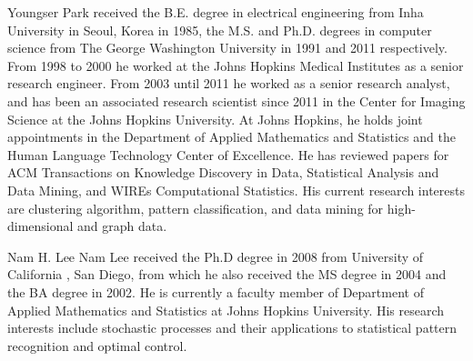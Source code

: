 \documentclass[10pt,draftclsnofoot,onecolumn]{IEEEtran}
\theoremstyle{definition}
\begin{document}
  \begin{IEEEbiography}{Youngser Park}
    received the B.E. degree in electrical engineering from Inha
    University in Seoul, Korea in 1985, the M.S. and Ph.D. degrees in
    computer science from The George Washington University in 1991 and
    2011 respectively. From 1998 to 2000 he worked at the Johns
    Hopkins Medical Institutes as a senior research engineer. From
    2003 until 2011 he worked as a senior research analyst, and has
    been an associated research scientist since 2011 in the Center for
    Imaging Science at the Johns Hopkins University. At Johns Hopkins,
    he holds joint appointments in the Department of Applied
    Mathematics and Statistics and the Human Language Technology
    Center of Excellence. He has reviewed papers for ACM Transactions
    on Knowledge Discovery in Data, Statistical Analysis and Data
    Mining, and WIREs Computational Statistics. His current research
    interests are clustering algorithm, pattern classification, and
    data mining for high-dimensional and graph data.
\end{IEEEbiography}

  \begin{IEEEbiography}{Nam H. Lee}
    Nam Lee received the Ph.D degree in 2008 from University of California ,
San Diego, from which he also received the MS degree in 2004 and the
BA degree in 2002. He is currently a faculty member of Department of Applied Mathematics
and Statistics at Johns Hopkins University.  His research interests
include stochastic processes and their applications to statistical pattern
recognition and optimal control.
\end{IEEEbiography}
\end{document}
